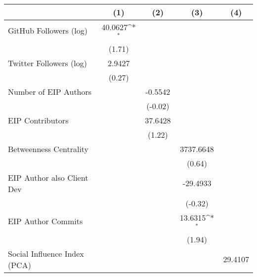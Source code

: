 {
\def\sym#1{\ifmmode^{#1}\else\(^{#1}\)\fi}
\begin{tabular}{l*{4}{c}}
\hline\hline
                                   &\multicolumn{1}{c}{(1)}         &\multicolumn{1}{c}{(2)}         &\multicolumn{1}{c}{(3)}         &\multicolumn{1}{c}{(4)}         \\
\hline
GitHub Followers (log)             &   40.0627\sym{*}  &                   &                   &                   \\
                                   &    (1.71)         &                   &                   &                   \\
[1em]
Twitter Followers (log)            &    2.9427         &                   &                   &                   \\
                                   &    (0.27)         &                   &                   &                   \\
[1em]
Number of EIP Authors              &                   &   -0.5542         &                   &                   \\
                                   &                   &   (-0.02)         &                   &                   \\
[1em]
EIP Contributors                   &                   &   37.6428         &                   &                   \\
                                   &                   &    (1.22)         &                   &                   \\
[1em]
Betweenness Centrality             &                   &                   & 3737.6648         &                   \\
                                   &                   &                   &    (0.64)         &                   \\
[1em]
EIP Author also Client Dev         &                   &                   &  -29.4933         &                   \\
                                   &                   &                   &   (-0.32)         &                   \\
[1em]
EIP Author Commits                 &                   &                   &   13.6315\sym{*}  &                   \\
                                   &                   &                   &    (1.94)         &                   \\
[1em]
Social Influence Index (PCA)       &                   &                   &                   &   29.4107         \\

\end{tabular}}
